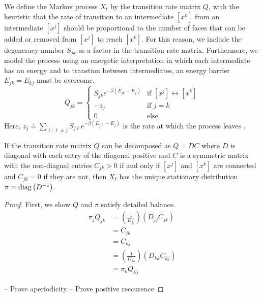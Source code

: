 We define the Markov process $X_t$ by the transition rate matrix $Q$, with the heuristic that the rate of transition to an intermediate $[x^k]$ from an intermediate $[x^j]$ should be proportional to the number of faces that can be added or removed from $[x^j]$ to reach $[x^k]$. For this reason, we include the degeneracy number $S_{jk}$ as a factor in the transition rate matrix. Furthermore, we model the process using an energetic interpretation in which each intermediate has an energy and to transtion between intermediates, an energy barrier $E_{jk} = E_{kj}$ must be overcome. 
\[
  Q_{jk} =
  \begin{cases}
   S_{jk}e^{-\beta\left(E_{jk} - E_{j}\right)} & \text{if } [x^j] \leftrightarrow [x^k]  \\
   -z_j       & \text{if } j = k \\
   0 & \text{else}
  \end{cases}
\]
Here, $z_j \doteq \sum_{\ell: \ell \neq j} S_{j\ell}e^{-\beta\left(E_{j\ell} - E_j\right)}$ is the rate at which the process leaves \xj. 

\begin{mythm}
\label{thm:StatDist}
If the transition rate matrix $Q$ can be decomposed as $Q = DC$ where $D$ is diagonal with each entry of the diagonal positive and $C$ is a symmetric matrix with the non-diagnal entries $C_{jk} > 0$ if and only if $[x^j]$ and $[x^k]$ are connected and $C_{jk} = 0$ if they are not, then $X_t$ has the unique stationary distribution $\pi = \operatorname{diag}\left(D^{-1}\right)$.         
\end{mythm}
\begin{proof}
First, we show $Q$ and $\pi$ satisfy detailed balance.
\begin{align}
\pi_jQ_{jk} &= \left(\frac{1}{D_{jj}}\right)\left(D_{jj}C_{jk}\right) \\
&= C_{jk} \\
&= C_{kj} \\
&= \left(\frac{1}{D_{kk}}\right)\left(D_{kk}C_{kj}\right) \\
                    &= \pi_kQ_{kj}
\end{align}

-- Prove aperiodicity 
-- Prove positive reccurence

\end{proof}


